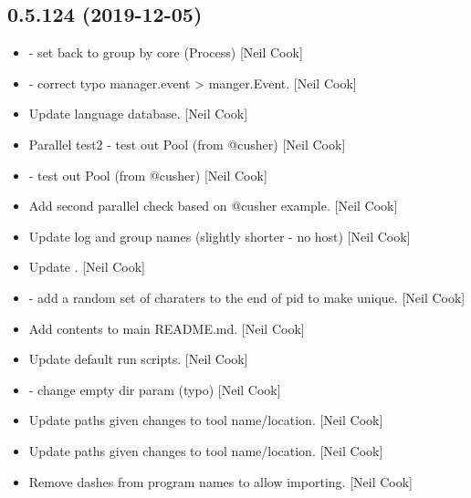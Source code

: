 \documentclass[a4paper,10pt,english]{report}
\begin{document}
\subsection{0.5.124 (2019-12-05)}
\label{\detokenize{misc/changelog:id18}}\begin{itemize}
\item {} 
 - set  back to group
by core (Process) {[}Neil Cook{]}

\item {} 
 - correct typo manager.event \textendash{}\textgreater{}
manger.Event. {[}Neil Cook{]}

\item {} 
Update language database. {[}Neil Cook{]}

\item {} 
Parallel test2 - test out Pool (from @cusher) {[}Neil Cook{]}

\item {} 
 - test out Pool (from @cusher)
{[}Neil Cook{]}

\item {} 
Add second parallel check based on @cusher example. {[}Neil Cook{]}

\item {} 
Update log and group names (slightly shorter - no host) {[}Neil Cook{]}

\item {} 
Update . {[}Neil Cook{]}

\item {} 
 - add a random set of charaters to the end of
pid to make unique. {[}Neil Cook{]}

\item {} 
Add contents to main README.md. {[}Neil Cook{]}

\item {} 
Update default run scripts. {[}Neil Cook{]}

\item {} 
 - change empty dir param (typo) {[}Neil
Cook{]}

\item {} 
Update paths given changes to tool name/location. {[}Neil Cook{]}

\item {} 
Update paths given changes to tool name/location. {[}Neil Cook{]}

\item {} 
Remove dashes from program names to allow importing. {[}Neil Cook{]}

\end{itemize}
\end{document}
